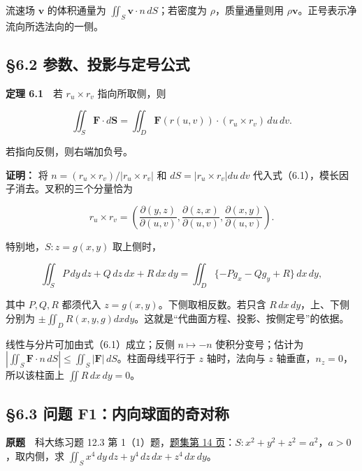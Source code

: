 \documentclass[11pt,a4paper]{article}
\begin{document}
流速场 \(\mathbf v\) 的体积通量为
\(\iint_S\mathbf v\cdot n\,dS\)；若密度为 \(\rho\)，质量通量则用
\(\rho\mathbf v\)。正号表示净流向所选法向的一侧。

\subsection{§6.2
参数、投影与定号公式}\label{ux53c2ux6570ux6295ux5f71ux4e0eux5b9aux53f7ux516cux5f0f}

\textbf{定理 6.1}　若 \(r_u\times r_v\) 指向所取侧，则

\begin{equation*}
 \iint_S\mathbf F\cdot d\mathbf S
 =\iint_D\mathbf F(r(u,v))\cdot(r_u\times r_v)\,du\,dv.\tag{6.2}
\end{equation*}

若指向反侧，则右端加负号。

\textbf{证明：} 将 \(n=(r_u\times r_v)/|r_u\times r_v|\) 和
\(dS=|r_u\times r_v|du\,dv\)
代入式（6.1），模长因子消去。叉积的三个分量恰为

\begin{equation*}
 r_u\times r_v=
 \left(\frac{\partial(y,z)}{\partial(u,v)},
 \frac{\partial(z,x)}{\partial(u,v)},
 \frac{\partial(x,y)}{\partial(u,v)}\right).
\end{equation*}

特别地，\(S:z=g(x,y)\) 取上侧时，

\begin{equation*}
 \iint_S P\,dy\,dz+Q\,dz\,dx+R\,dx\,dy
 =\iint_D\{-Pg_x-Qg_y+R\}\,dx\,dy,\tag{6.3}
\end{equation*}

其中 \(P,Q,R\) 都须代入 \(z=g(x,y)\)。下侧取相反数。若只含
\(R\,dx\,dy\)，上、下侧分别为
\(\pm\iint_D R(x,y,g)dxdy\)。这就是``代曲面方程、投影、按侧定号''的依据。

线性与分片可加由式（6.1）成立；反侧 \(n\mapsto-n\) 使积分变号；估计为
\(|\iint_S\mathbf F\cdot n\,dS|\le\iint_S|\mathbf F|\,dS\)。柱面母线平行于
\(z\) 轴时，法向与 \(z\) 轴垂直，\(n_z=0\)，所以该柱面上
\(\iint R\,dx\,dy=0\)。

\subsection{§6.3 问题
F1：内向球面的奇对称}\label{ux95eeux9898-f1ux5185ux5411ux7403ux9762ux7684ux5947ux5bf9ux79f0}

\textbf{原题}　科大练习题 12.3 第
1（1）题，\href{https://zj139.github.io/math-notes/files/problems/科大数分习题-v2\%282\%29.pdf\#page=14}{题集第
14 页}：\(S:x^2+y^2+z^2=a^2\)，\(a>0\)，取内侧，求
\(\iint_Sx^4\,dy\,dz+y^4\,dz\,dx+z^4\,dx\,dy\)。
\end{document}
